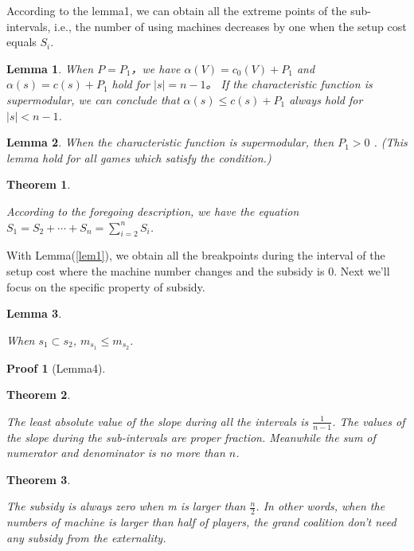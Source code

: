 \documentclass[UTF8]{article}
\newtheorem{thm}{Theorem}
\newtheorem{lemma}{Lemma}
\newtheorem{pf}{Proof}
\begin{document}
According to the lemma1, we can obtain all the extreme points of the sub-intervals, i.e., the number of using machines decreases by one when the setup cost equals $S_i$.


\begin{lemma}\label{lem2}
When $P=P_1$，we have $\alpha(V)=c_0(V)+P_1$ and $\alpha(s)=c(s)+P_1$ hold for $\left| s \right|= n-1$。
If the characteristic function is supermodular, we can conclude that $\alpha(s) \leq c(s)+P_1$ always hold for $\left| s \right| < n-1 $.

\end{lemma}

\begin{lemma}\label{lem3}
When the characteristic function is supermodular, then $P_1 > 0$ . (This lemma hold for all games which satisfy the condition.)

\end{lemma}



\begin{thm}\label{thm1}

According to the foregoing description, we have the equation $S_{1}=S_{2}+\cdots+S_{n}=\sum_{i=2}^n S_i$.

\end{thm}


With Lemma(\ref{lem1}), we obtain all the breakpoints during the interval of the setup cost where the machine number changes and the subsidy is $0$. Next we'll focus on the specific property of subsidy.


\begin{lemma}\label{lem4}

When $s_1 \subset s_2$,
$m_{s_1} \leq m_{s_2}$.

\end{lemma}

\begin{pf}[Lemma4]

  
\end{pf}

\begin{thm}\label{thm2}

The least absolute value of the slope during all the intervals is $\frac{1}{n-1}$.
The values of the slope during the sub-intervals are proper fraction. Meanwhile the sum of numerator and denominator is no more than $n$.

\end{thm}


\begin{thm}\label{thm3}

The subsidy is always zero when m is larger than $\frac{n}{2}$. In other words, when the numbers of machine is larger than half of players, the grand coalition don't need any subsidy from the externality.

\end{thm}
\end{document}

